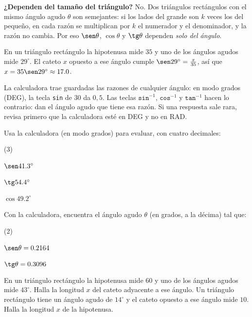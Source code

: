 \documentclass[11pt]{article}
\begin{document}
\textbf{¿Dependen del tamaño del triángulo?} No. Dos triángulos rectángulos con
el mismo ángulo agudo $\theta$ son semejantes: si los lados del grande son $k$
veces los del pequeño, en cada razón se multiplican por $k$ el numerador y el
denominador, y la razón no cambia. Por eso $\sen\theta$, $\cos\theta$ y
$\tg\theta$ dependen \emph{solo del ángulo}.

\begin{ejemplo}
En un triángulo rectángulo la hipotenusa mide $35$ y uno de los ángulos agudos
mide $29^\circ$. El cateto $x$ opuesto a ese ángulo cumple
$\sen 29^\circ = \frac{x}{35}$, así que $x = 35\sen 29^\circ \approx \num{17,0}$.
\end{ejemplo}

\begin{aplicacion}
La calculadora trae guardadas las razones de cualquier ángulo: en modo grados
(DEG), la tecla \texttt{sin} de $30$ da $0{,}5$. Las teclas
$\texttt{sin}^{-1}$, $\texttt{cos}^{-1}$ y $\texttt{tan}^{-1}$ hacen lo contrario:
dan el ángulo agudo que tiene esa razón. Si una respuesta sale rara, revisa
primero que la calculadora esté en DEG y no en RAD.
\end{aplicacion}

\begin{preguntas}
\pregunta Usa la calculadora (en modo grados) para evaluar, con cuatro decimales:
\begin{opciones*}(3)
  \item $\sen \num{41,3}^\circ$
  \item $\tg \num{54,4}^\circ$
  \item $\cos \num{49,2}^\circ$
\end{opciones*}
\espacio{1.5cm}
\pregunta Con la calculadora, encuentra el ángulo agudo $\theta$ (en grados, a la
décima) tal que:
\begin{opciones*}(2)
  \item $\sen\theta = \num{0,2164}$
  \item $\tg\theta = \num{0,3096}$
\end{opciones*}
\espacio{1.5cm}
\pregunta En un triángulo rectángulo la hipotenusa mide $60$ y uno de los ángulos
agudos mide $43^\circ$. Halla la longitud $x$ del cateto adyacente a ese ángulo.
\espacio{2cm}
\pregunta Un triángulo rectángulo tiene un ángulo agudo de $14^\circ$ y el cateto
opuesto a ese ángulo mide $10$. Halla la longitud $x$ de la hipotenusa.
\espacio{2cm}
\end{preguntas}
\end{document}
